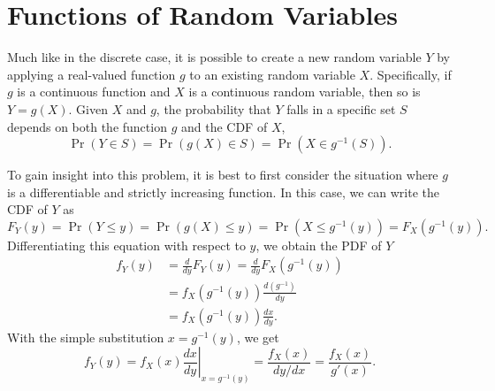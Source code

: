 \chapter{Functions of Random Variables}

Much like in the discrete case, it is possible to create a new random variable $Y$ by applying a real-valued function $g$ to an existing random variable $X$.
Specifically, if $g$ is a continuous function and $X$ is a continuous random variable, then so is $Y = g(X)$.
Given $X$ and $g$, the probability that $Y$ falls in a specific set $S$ depends on both the function $g$ and the CDF of $X$,
\begin{equation*}
\Pr (Y \in S) = \Pr (g(X) \in S) 
= \Pr (X \in g^{-1}(S)).
\end{equation*}

To gain insight into this problem, it is best to first consider the situation where $g$ is a differentiable and strictly increasing function.
In this case, we can write the CDF of $Y$ as
\begin{equation*}
F_Y(y) = \Pr (Y \leq y) = \Pr (g(X) \leq y)
= \Pr \left( X \leq g^{-1}(y) \right)
= F_X \left( g^{-1} (y) \right) .
\end{equation*}
Differentiating this equation with respect to $y$, we obtain the PDF of $Y$
\begin{equation*}
\begin{split}
f_Y (y) &= \frac{d}{dy} F_Y(y)
= \frac{d}{dy} F_X \left( g^{-1} (y) \right) \\
&= f_X \left( g^{-1} (y) \right) \frac{d \left( g^{-1} \right)}{dy} \\
&= f_X \left( g^{-1} (y) \right) \frac{dx}{dy} .
\end{split}
\end{equation*}
With the simple substitution $x = g^{-1} (y)$, we get
\begin{equation*}
f_Y (y) = f_X (x) \left. \frac{dx}{dy} \right|_{x = g^{-1}(y)}
= \frac{f_X (x)}{{dy}/{dx}}
= \frac{f_X (x)}{g'(x)} .
\end{equation*}

